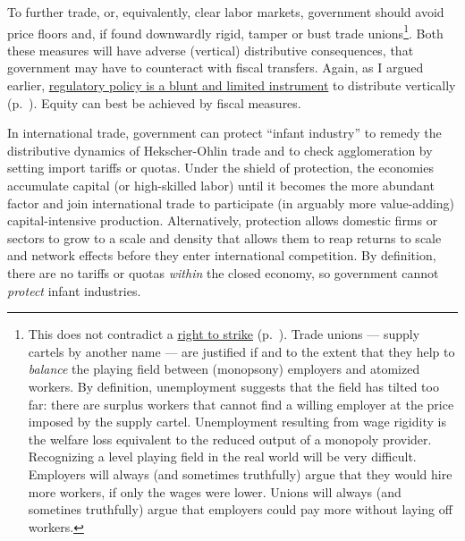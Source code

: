 To further trade, or, equivalently, clear labor markets, government should avoid price floors and, if found downwardly rigid, tamper or bust trade unions\footnote{
	This does not contradict a \hyperref[sec:redistributivepolicy]{right to strike} (p.~\pageref{sec:redistributivepolicy}). Trade unions --- supply cartels by another name --- are justified if and to the extent that they help to \emph{balance} the playing field between (monopsony) employers and atomized workers. By definition, unemployment suggests that the field has tilted too far: there are surplus workers that cannot find a willing employer at the price imposed by the supply cartel. Unemployment resulting from wage rigidity is the welfare loss equivalent to the reduced output of a monopoly provider.\\
	Recognizing a level playing field in the real world will be very difficult. Employers will always (and sometimes truthfully) argue that they would hire more workers, if only the wages were lower. Unions will always (and sometines truthfully) argue that employers could pay more without laying off workers.}. 
Both these measures will have adverse (vertical) distributive consequences, that government may have to counteract with fiscal transfers. Again, as I argued earlier, \hyperref[sec:redistributivepolicy]{regulatory policy is a blunt and limited instrument} to distribute vertically (p.~\pageref{sec:redistributivepolicy}). Equity can best be achieved by fiscal measures.

In international trade, government can protect ``infant industry'' to remedy the distributive dynamics of Hekscher-Ohlin trade and to check agglomeration by setting import tariffs or quotas. Under the shield of protection, the economies accumulate capital (or high-skilled labor) until it becomes the more abundant factor and join international trade to participate (in arguably more value-adding) capital-intensive production. Alternatively, protection allows domestic firms or sectors to grow to a scale and density that allows them to reap returns to scale and network effects before they enter international competition. By definition, there are no tariffs or quotas \emph{within} the closed economy, so government cannot \emph{protect} infant industries. %

